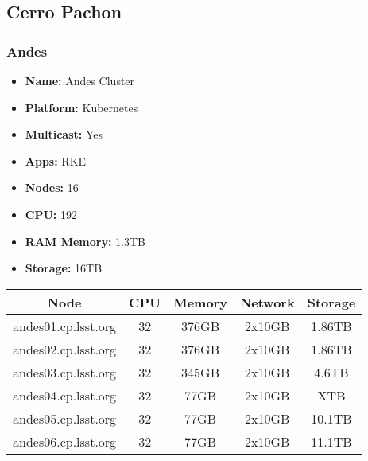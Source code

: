 \newpage
\subsection{Cerro Pachon}
\subsubsection{Andes}
\begin{itemize}
  \itemsep0em 
  \item \textbf{Name:}       Andes Cluster
  \item \textbf{Platform:}   Kubernetes
  \item \textbf{Multicast:}  Yes
  \item \textbf{Apps:}       RKE
  \item \textbf{Nodes:}      16
  \item \textbf{CPU:}        192
  \item \textbf{RAM Memory:} 1.3TB
  \item \textbf{Storage:}   16TB
\end{itemize}
\begin{center}
  \small
  \begin{tabular}{||c c c c c||} 
    \hline
    \textbf{Node} & \textbf{CPU} & \textbf{Memory} & \textbf{Network} & \textbf{Storage} \\ [0.5ex]
    \hline
    andes01.cp.lsst.org & 32 & 376GB & 2x10GB & 1.86TB \\
    \hline
    andes02.cp.lsst.org & 32 & 376GB & 2x10GB & 1.86TB \\
    \hline
    andes03.cp.lsst.org & 32 & 345GB & 2x10GB & 4.6TB \\
    \hline
    andes04.cp.lsst.org & 32 & 77GB & 2x10GB & XTB \\
    \hline
    andes05.cp.lsst.org & 32 & 77GB & 2x10GB & 10.1TB\\
    \hline
    andes06.cp.lsst.org & 32 & 77GB & 2x10GB & 11.1TB \\
    \hline
  \end{tabular}
\end{center}

\newpage

